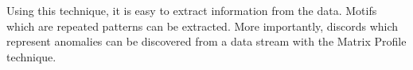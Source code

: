 Using this technique, it is easy to extract information from the data. Motifs which are repeated patterns can be extracted. More importantly, discords which represent anomalies can be discovered from a data stream with the Matrix Profile technique. 









